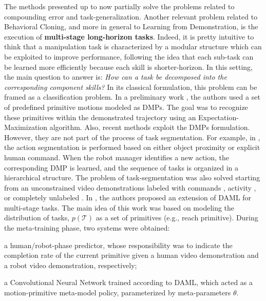\newline The methods presented up to now partially solve the problems related to compounding error and task-generalization. Another relevant problem related to Behavioral Cloning, and more in general to Learning from Demonstration, is the execution of \textbf{multi-stage long-horizon tasks}. Indeed, it is pretty intuitive to think that a manipulation task is characterized by a modular structure which can be exploited to improve performance, following the idea that each sub-task can be learned more efficiently because each skill is shorter-horizon. In this setting, the main question to answer is: \textit{How can a task be decomposed into the corresponding component skills?} In its classical formulation, this problem can be framed as a classification problem. In a preliminary work \cite{meier2011movement_primitive}, the authors used a set of predefined primitive motions modeled as DMPs. The goal was to recognize these primitives within the demonstrated trajectory using an Expectation-Maximization algorithm. Also, recent methods \cite{caccavale2019kinesthetic,agostini2020manipulation} exploit the DMPs formulation. However, they are not part of the process of task segmentation. For example, in \cite{caccavale2019kinesthetic}, the action segmentation is performed based on either object proximity or explicit human command. When the robot manager identifies a new action, the corresponding DMP is learned, and the sequence of tasks is organized in a hierarchical structure. The problem of task-segmentation was also solved starting from an unconstrained video demonstrations labeled with commands \cite{xu2018neural_task_programming}, activity \cite{yang2015robot}, or completely unlabeled \cite{yu2018one_shot_hil,Mandlekar2020GTI}. In \cite{yu2018one_shot_hil}, the authors proposed an extension of DAML for multi-stage tasks. The main idea of this work was based on modeling the distribution of tasks, $p(\mathcal{T})$ as a set of primitives (e.g., reach primitive). During the meta-training phase, two systems were obtained: \begin{enumerate*}[label=(\textbf{\arabic*})]
    \item a human/robot-phase predictor, whose responsibility was to indicate the completion rate of the current primitive given a human video demonstration and a robot video demonstration, respectively;
    \item a Convolutional Neural Network trained according to DAML, which acted as a motion-primitive meta-model policy, parameterized by meta-parameters $\theta$.

\end{enumerate*}
